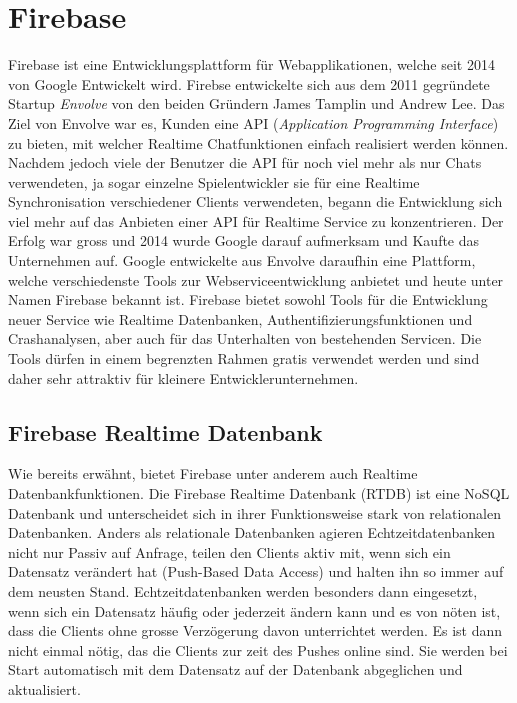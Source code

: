 \documentclass[a4paper,11pt]{report}
\begin{document}
					
			\section{Firebase}
			Firebase ist eine  Entwicklungsplattform für Webapplikationen, welche seit 2014 von Google Entwickelt wird. Firebse entwickelte sich aus dem 2011 gegründete Startup \emph{Envolve} von den beiden Gründern James Tamplin und Andrew Lee. Das Ziel von Envolve war es, Kunden eine API (\emph{Application Programming Interface}) zu bieten, mit welcher Realtime Chatfunktionen einfach realisiert werden können. Nachdem jedoch viele der Benutzer die API für noch viel mehr als nur Chats verwendeten, ja sogar einzelne Spielentwickler sie für eine Realtime Synchronisation verschiedener Clients verwendeten, begann die Entwicklung sich viel mehr auf das Anbieten einer API für Realtime Service zu konzentrieren. Der Erfolg war gross und 2014 wurde Google darauf aufmerksam und Kaufte das Unternehmen auf. Google entwickelte aus Envolve daraufhin eine Plattform, welche verschiedenste Tools zur Webserviceentwicklung anbietet und heute unter Namen Firebase bekannt ist. Firebase bietet sowohl Tools für die Entwicklung neuer Service wie Realtime Datenbanken, Authentifizierungsfunktionen und Crashanalysen, aber auch für das Unterhalten von bestehenden Servicen. Die Tools dürfen in einem begrenzten Rahmen gratis verwendet werden und sind daher sehr attraktiv für kleinere Entwicklerunternehmen.\cite{Firebase}
				\subsection{Firebase Realtime Datenbank}
				Wie bereits erwähnt, bietet Firebase unter anderem auch Realtime Datenbankfunktionen. Die Firebase Realtime Datenbank (RTDB) ist eine NoSQL Datenbank und unterscheidet sich in ihrer Funktionsweise stark von relationalen Datenbanken. Anders als relationale Datenbanken agieren Echtzeitdatenbanken nicht nur Passiv auf Anfrage, teilen den Clients aktiv mit, wenn sich ein Datensatz verändert hat (Push-Based Data Access) und halten ihn so immer auf dem neusten Stand. Echtzeitdatenbanken werden besonders dann eingesetzt, wenn sich ein Datensatz häufig oder jederzeit ändern kann und es von nöten ist, dass die Clients ohne grosse Verzögerung davon unterrichtet werden.\cite{RealtimeDatabase} Es ist dann nicht einmal nötig, das die Clients zur zeit des Pushes online sind. Sie werden bei Start automatisch mit dem Datensatz auf der Datenbank abgeglichen und aktualisiert.\cite{FirebaseRTDB}
				
\end{document}
